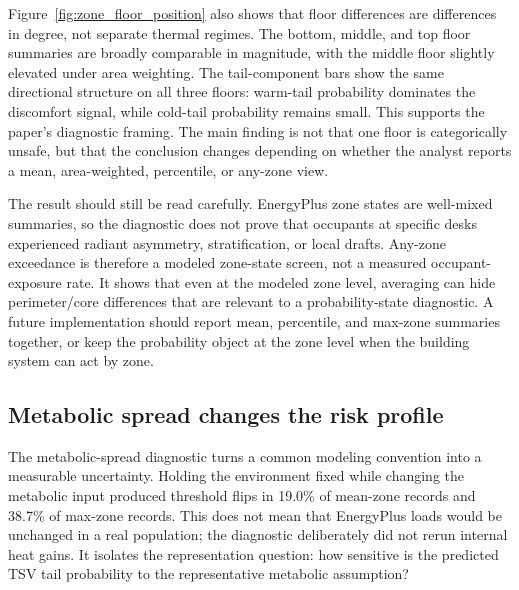 Figure~\ref{fig:zone_floor_position} also shows that floor differences are differences in degree, not separate thermal regimes. The bottom, middle, and top floor summaries are broadly comparable in magnitude, with the middle floor slightly elevated under area weighting. The tail-component bars show the same directional structure on all three floors: warm-tail probability dominates the discomfort signal, while cold-tail probability remains small. This supports the paper's diagnostic framing. The main finding is not that one floor is categorically unsafe, but that the conclusion changes depending on whether the analyst reports a mean, area-weighted, percentile, or any-zone view.

The result should still be read carefully. EnergyPlus zone states are well-mixed summaries, so the diagnostic does not prove that occupants at specific desks experienced radiant asymmetry, stratification, or local drafts. Any-zone exceedance is therefore a modeled zone-state screen, not a measured occupant-exposure rate. It shows that even at the modeled zone level, averaging can hide perimeter/core differences that are relevant to a probability-state diagnostic. A future implementation should report mean, percentile, and max-zone summaries together, or keep the probability object at the zone level when the building system can act by zone.

\subsection{Metabolic spread changes the risk profile}

The metabolic-spread diagnostic turns a common modeling convention into a measurable uncertainty. Holding the environment fixed while changing the metabolic input produced threshold flips in 19.0\% of mean-zone records and 38.7\% of max-zone records. This does not mean that EnergyPlus loads would be unchanged in a real population; the diagnostic deliberately did not rerun internal heat gains. It isolates the representation question: how sensitive is the predicted TSV tail probability to the representative metabolic assumption?

